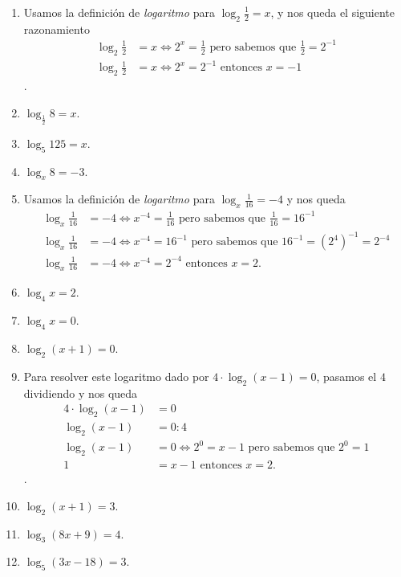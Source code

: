 \documentclass[12pt]{examdesign}
\theoremstyle{plain}
\theoremstyle{definition}
\theoremstyle{remark}
\begin{document}
\begin{shortanswer}[title={Leemos el material de consulta y realizamos las actividades propuestas}]
\begin{question}
\begin{answer}
\begin{enumerate}
    	    		\item Usamos la definición de \textit{logaritmo} para $\log_{2}\frac{1}{2}=x$, y nos queda el siguiente razonamiento 
    	    		\begin{align*}
    	    		    \log_{2}\frac{1}{2}&=x\Leftrightarrow 2^{x}=\frac{1}{2}\mbox{ pero sabemos que $\frac{1}{2}=2^{-1}$}\\
    	    		    \log_{2}\frac{1}{2}&=x\Leftrightarrow 2^{x}=2^{-1} \mbox{ entonces $x=-1$}
    	    		\end{align*}.
    	    		\item $\log_{\frac{1}{2}}8=x$.
    	    		\item $\log_{5}125=x$.
    	    		\item $\log_{x}8=-3$.
    	    		\item Usamos la definición de \textit{logaritmo} para $\log_{x}\frac{1}{16}=-4$ y nos queda
    	    		\begin{align*}
    	    			\log_{x}\frac{1}{16}&=-4\Leftrightarrow x^{-4}=\frac{1}{16}\mbox{ pero sabemos que $\frac{1}{16}=16^{-1}$}\\
    	    			\log_{x}\frac{1}{16}&=-4\Leftrightarrow x^{-4}=16^{-1}\mbox{ pero sabemos que $16^{-1}={\left(2^{4}\right)}^{-1}=2^{-4}$}\\
    	    			\log_{x}\frac{1}{16}&=-4\Leftrightarrow x^{-4}=2^{-4} \mbox{ entonces $x=2$}.
    	    		\end{align*}
    	    		\item $\log_{4}x=2$.
    	    		\item $\log_{4}x=0$.
    	    		\item $\log_{2}(x+1)=0$.
    	    		\item Para resolver este logaritmo dado por $4\cdot\log_{2}(x-1)=0$, pasamos el $4$ dividiendo y nos queda
    	    		\begin{align*}
    	    		4\cdot\log_{2}(x-1)&=0\\
    	    		\log_{2}(x-1)&=0:4\\
    	    		\log_{2}(x-1)&=0\Leftrightarrow 2^{0}=x-1\mbox{ pero sabemos que $2^{0}=1$}\\
    	    		1&=x-1\mbox{ entonces $x=2$}.
    	    		\end{align*}.
    	    		\item $\log_{2}(x+1)=3$.
    	    		\item $\log_{3}(8x+9)=4$.
    	    		\item $\log_{5}(3x-18)=3$.
    	    	\end{enumerate}
    	    \end{answer}
    	\end{question}
    \end{shortanswer}
\end{document}
